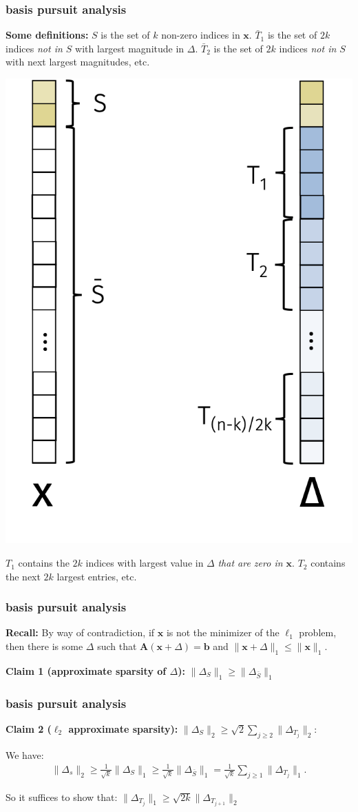 \documentclass[compress]{beamer}
\newcommand{\bv}[1]{\mathbf{#1}}
\begin{document}
	\begin{frame}[t]
		\frametitle{basis pursuit analysis}\small
		\textbf{Some definitions:} $S$ is the set of $k$ non-zero indices in $\bv{x}$. $\bar{T}_1$ is the set of $2k$ indices \emph{not in $S$} with largest magnitude in $\Delta$. $\bar{T}_2$ is the set of $2k$ indices  \emph{not in $S$} with next largest magnitudes, etc.
		\begin{center}
			\includegraphics[width=.45\textwidth]{indexingForProof.png}
		\end{center}
		$T_1$ contains the $2k$ indices with largest value in $\Delta$ \emph{that are zero in $\bv{x}$}. $T_2$ contains the next $2k$ largest entries, etc. 
	\end{frame}
	
	\begin{frame}[t]
		\frametitle{basis pursuit analysis}
		\textbf{Recall:} By way of contradiction, if $\bv{x}$ is not the minimizer of the $\ell_1$ problem, then there is some $\Delta$ such that $\bv{A}(\bv{x} + \Delta) = \bv{b}$ and $\|\bv{x} + \Delta\|_1 \leq \|\bv{x}\|_1$.
		
		\vspace{1em} 
		\textbf{Claim 1 (approximate sparsity of $\Delta$):}
		$\|\Delta_{S}\|_1 \geq \|\Delta_{\bar{S}}\|_1$
	\end{frame}
	
	\begin{frame}[t]
		\frametitle{basis pursuit analysis}
		\textbf{Claim 2 ($\ell_2$ approximate sparsity):}
		$\|\Delta_{S}\|_2 \geq \sqrt{2}\sum_{j\geq 2} \|\Delta_{T_j}\|_2$:
		
		We have:
		\begin{align*}
			\|\Delta_s\|_2 \geq \frac{1}{\sqrt{k}} \|\Delta_{S}\|_1 \geq \frac{1}{\sqrt{k}}\|\Delta_{\bar{S}}\|_1 = \frac{1}{\sqrt{k}}\sum_{j\geq 1} \|\Delta_{T_j}\|_1.
		\end{align*}
		
		So it suffices to show that: $\|\Delta_{T_j}\|_1 \geq \sqrt{2k}\|\Delta_{T_{j+1}}\|_2$
	\end{frame}
	
\end{document}
